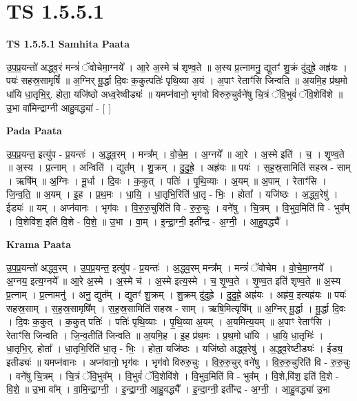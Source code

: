\documentclass[17pt]{extarticle}
\begin{document}
\section{ TS 1.5.5.1 }

\textbf{TS 1.5.5.1 } \newline
\textbf{Samhita Paata} \newline

उ॒प॒प्र॒यन्तो॑ अद्ध्व॒रं मन्त्रं॑ ॅवोचेमा॒ग्नये᳚ । आ॒रे अ॒स्मे च॑ शृण्व॒ते ॥ अ॒स्य प्र॒त्नामनु॒ द्युतꣳ॑ शु॒क्रं दु॑दुह्रे॒ अह्र॑यः । पयः॑ सहस्र॒सामृषिं᳚ ॥ अ॒ग्निर् मू॒र्द्धा दि॒वः क॒कुत्पतिः॑ पृथि॒व्या अ॒यं । अ॒पाꣳ रेताꣳ॑सि जिन्वति ॥ अ॒यमि॒ह प्र॑थ॒मो धा॑यि धा॒तृभि॒र्॒. होता॒ यजि॑ष्ठो अध्व॒रेष्वीड्यः॑ ॥ यमप्न॑वानो॒ भृग॑वो विरुरु॒चुर्वने॑षु चि॒त्रं ॅवि॒भुवं॑ ॅवि॒शेवि॑शे ॥ उ॒भा वा॑मिन्द्राग्नी आहु॒वद्ध्या॑ - [ ] \newline

\textbf{Pada Paata} \newline

उ॒प॒प्र॒यन्त॒ इत्यु॑प - प्र॒यन्तः॑ । अ॒द्ध्व॒रम् । मन्त्र᳚म् । वो॒चे॒म॒ । अ॒ग्नये᳚ ॥ आ॒रे । अ॒स्मे इति॑ । च॒ । शृ॒ण्व॒ते ॥ अ॒स्य । प्र॒त्नाम् । अन्विति॑ । द्युत᳚म् । शु॒क्रम् । दु॒दु॒ह्रे॒ । अह्र॑यः ॥ पयः॑ । स॒ह॒स्र॒सामिति॑ सहस्र - साम् । ऋषि᳚म् ॥ अ॒ग्निः । मू॒र्धा । दि॒वः । क॒कुत् । पतिः॑ । पृ॒थि॒व्याः । अ॒यम् ॥ अ॒पाम् । रेताꣳ॑सि । जि॒न्व॒ति॒ ॥ अ॒यम् । इ॒ह । प्र॒थ॒मः । धा॒यि॒ । धा॒तृभि॒रिति॑ धा॒तृ - भिः॒ । होता᳚ । यजि॑ष्ठः । अ॒द्ध्व॒रेषु॑ । ईड्यः॑ ॥ यम् । अप्न॑वानः । भृग॑वः । वि॒रु॒रु॒चुरिति॑ वि - रु॒रु॒चुः । वने॑षु । चि॒त्रम् । वि॒भुव॒मिति॑ वि - भुव᳚म् । वि॒शेवि॑श॒ इति॑ वि॒शे - वि॒शे॒ ॥ उ॒भा । वा॒म् । इ॒न्द्रा॒ग्नी॒ इती᳚न्द्र - अ॒ग्नी॒ । आ॒हु॒वद्ध्यै᳚ ।  \newline


\textbf{Krama Paata} \newline

उ॒प॒प्र॒यन्तो॑ अद्ध्व॒रम् । उ॒प॒प्र॒यन्त॒ इत्यु॑प - प्र॒यन्तः॑ । अ॒द्ध्व॒रम् मन्त्र᳚म् । मन्त्रं॑ ॅवोचेम । वो॒चे॒मा॒ग्नये᳚ । अ॒ग्नय॒ इत्य॒ग्नये᳚ ॥ आ॒रे अ॒स्मे । अ॒स्मे च॑ । अ॒स्मे इत्य॒स्मे । च॒ शृ॒ण्व॒ते । शृ॒ण्व॒त इति॑ शृण्व॒ते ॥ अ॒स्य प्र॒त्नाम् । प्र॒त्नामनु॑ । अनु॒ द्युत᳚म् । द्युतꣳ॑ शु॒क्रम् । शु॒क्रम् दु॑दुह्रे । दु॒दु॒ह्रे॒ अह्र॑यः । अह्र॑य॒ इत्यह्र॑यः ॥ पयः॑ सहस्र॒साम् । स॒ह॒स्र॒सामृषि᳚म् । स॒ह॒स्र॒सामिति॑ सहस्र - साम् । ऋषि॒मित्यृषि᳚म् ॥ अ॒ग्निर् मू॒र्द्धा । मू॒र्द्धा दि॒वः । दि॒वः क॒कुत् । क॒कुत् पतिः॑ । पतिः॑ पृथि॒व्याः । पृ॒थि॒व्या अ॒यम् । अ॒यमित्य॒यम् ॥ अ॒पाꣳ रेताꣳ॑सि । रेताꣳ॑सि जिन्वति । जि॒न्व॒तीति॑ जिन्वति ॥ अ॒यमि॒ह । इ॒ह प्र॑थ॒मः । प्र॒थ॒मो धा॑यि । धा॒यि॒ धा॒तृभिः॑ । धा॒तृभि॒र्. होता᳚ । धा॒तृभि॒रिति॑ धा॒तृ - भिः॒ । होता॒ यजि॑ष्ठः । यजि॑ष्ठो अद्ध्व॒रेषु॑ । अ॒द्ध्व॒रेष्टीड्यः॑ । ईड्य॒ इतीड्यः॑ ॥ यमप्न॑वानः । अप्न॑वानो॒ भृग॑वः । भृग॑वो विरुरु॒चुः । वि॒रु॒रु॒चुर् वने॑षु । वि॒रु॒रु॒चुरिति॑ वि - रु॒रु॒चुः । वने॑षु चि॒त्रम् । चि॒त्रं ॅवि॒भुव᳚म् । वि॒भुवं॑ ॅवि॒शेवि॑शे । वि॒भुव॒मिति॑ वि - भुव᳚म् । वि॒शे,वि॑श॒ इति॑ वि॒शे - वि॒शे॒ ॥ उ॒भा वा᳚म् । वा॒मि॒न्द्रा॒ग्नी॒ । इ॒न्द्रा॒ग्नी॒ आ॒हु॒वद्ध्यै᳚ । इ॒न्दा॒ग्नी॒ इती᳚न्द्र - अ॒ग्नी॒ । आ॒हु॒वद्ध्या॑ उ॒भा \newline
\end{document}
